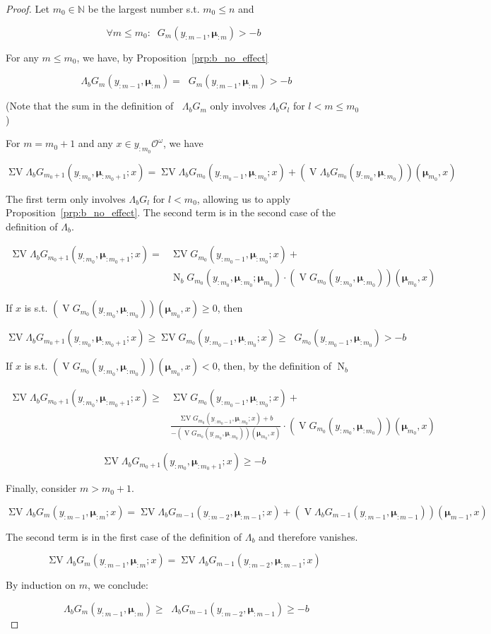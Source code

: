 \documentclass[11pt]{article}
\theoremstyle{definition}
\theoremstyle{plain}
\newcommand{\Nats}{\mathbb{N}}
\newcommand{\Ob}{\mathcal{O}}
\newcommand{\OO}{\Ob^\omega}
\DeclareMathOperator{\V}{V}
\DeclareMathOperator{\SV}{\Sigma V}
\DeclareMathOperator{\SVM}{\Sigma V_{\min}}
\DeclareMathOperator{\Nr}{N}
\newcommand{\Bd}{\Lambda}
\newcommand{\BM}{\bm{\mu}}
\begin{document}
\begin{proof}

Let ${m_0 \in \Nats}$ be the largest number s.t. ${m_0 \leq n}$ and 

$$\forall m \leq m_0: \SVM G_m(y_{:m-1},\BM_{:m}) > -b$$

For any ${m \leq m_0}$, we have, by Proposition~\ref{prp:b_no_effect}

$$\SVM \Bd_b G_m(y_{:m-1},\BM_{:m})=\SVM G_m(y_{:m-1},\BM_{:m}) > -b$$

(Note that the sum in the definition of ${\SVM \Bd_b G_m}$ only involves ${\Bd_b G_l}$ for ${l < m \leq m_0}$)

For ${m=m_0+1}$ and any $x \in y_{:m_0}\OO$, we have

$$\SV \Bd_b G_{m_0+1}(y_{:m_0},\BM_{:m_0+1};x) = \SV \Bd_b G_{m_0}(y_{:m_0-1},\BM_{:m_0};x) + (\V \Bd_b G_{m_0}(y_{:m_0},\BM_{:m_0}))(\BM_{m_0},x)$$

The first term only involves ${\Bd_b G_l}$ for ${l < m_0}$, allowing us to apply Proposition~\ref{prp:b_no_effect}. The second term is in the second case of the definition of $\Bd_b$.

\begin{align*}
\SV \Bd_b G_{m_0+1}(y_{:m_0},\BM_{:m_0+1};x) = &\SV G_{m_0}(y_{:m_0-1},\BM_{:m_0};x) +\\ &\Nr_b G_{m_0}(y_{:m_0},\BM_{:m_0};\BM_{m_0}) \cdot (\V G_{m_0}(y_{:m_0},\BM_{:m_0}))(\BM_{m_0},x)
\end{align*}

If ${x}$ is s.t. ${(\V G_{m_0}(y_{:m_0},\BM_{:m_0}))(\BM_{m_0},x) \geq 0}$, then

\[\SV \Bd_b G_{m_0+1}(y_{:m_0},\BM_{:m_0+1};x) \geq \SV G_{m_0}(y_{:m_0-1},\BM_{:m_0};x)\geq \SVM G_{m_0}(y_{:m_0-1},\BM_{:m_0}) > -b\]

If ${x}$ is s.t. ${(\V G_{m_0}(y_{:m_0},\BM_{:m_0}))(\BM_{m_0},x) < 0}$, then, by the definition of $\Nr_b$

\begin{align*}
\SV \Bd_b G_{m_0+1}(y_{:m_0},\BM_{:m_0+1};x) \geq &\SV G_{m_0}(y_{:m_0-1},\BM_{:m_0};x)+ \\
&\frac{\SV G_{m_0}(y_{:m_0-1},\BM_{:m_0};x) + b}{-(\V G_{m_0}(y_{:m_0},\BM_{:m_0}))(\BM_{m_0},x)} \cdot (\V G_{m_0}(y_{:m_0},\BM_{:m_0}))(\BM_{m_0},x)
\end{align*}

$$\SV \Bd_b G_{m_0+1}(y_{:m_0},\BM_{:m_0+1};x) \geq -b$$

Finally, consider ${m > m_0 + 1}$.

$$\SV \Bd_b G_{m}(y_{:m-1},\BM_{:m};x) = \SV \Bd_b G_{m-1}(y_{:m-2},\BM_{:m-1};x) + (\V \Bd_b G_{m-1}(y_{:m-1},\BM_{:m-1}))(\BM_{m-1},x)$$

The second term is in the first case of the definition of $\Bd_b$ and therefore vanishes.

$$\SV \Bd_b G_{m}(y_{:m-1},\BM_{:m};x) = \SV \Bd_b G_{m-1}(y_{:m-2},\BM_{:m-1};x)$$

By induction on ${m}$, we conclude:

$$\SVM \Bd_b G_{m}(y_{:m-1},\BM_{:m}) \geq \SVM \Bd_b G_{m-1}(y_{:m-2},\BM_{:m-1}) \geq -b$$
\end{proof}
\end{document}
